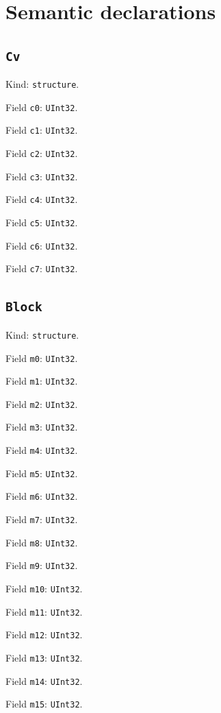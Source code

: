 \documentclass[11pt]{article}
\begin{document}
\section*{Semantic declarations}
\subsection*{\texttt{Cv}}
\noindent Kind: \texttt{structure}.\par
\noindent Field \texttt{c0}: \texttt{UInt32}.\par
\noindent Field \texttt{c1}: \texttt{UInt32}.\par
\noindent Field \texttt{c2}: \texttt{UInt32}.\par
\noindent Field \texttt{c3}: \texttt{UInt32}.\par
\noindent Field \texttt{c4}: \texttt{UInt32}.\par
\noindent Field \texttt{c5}: \texttt{UInt32}.\par
\noindent Field \texttt{c6}: \texttt{UInt32}.\par
\noindent Field \texttt{c7}: \texttt{UInt32}.\par
\subsection*{\texttt{Block}}
\noindent Kind: \texttt{structure}.\par
\noindent Field \texttt{m0}: \texttt{UInt32}.\par
\noindent Field \texttt{m1}: \texttt{UInt32}.\par
\noindent Field \texttt{m2}: \texttt{UInt32}.\par
\noindent Field \texttt{m3}: \texttt{UInt32}.\par
\noindent Field \texttt{m4}: \texttt{UInt32}.\par
\noindent Field \texttt{m5}: \texttt{UInt32}.\par
\noindent Field \texttt{m6}: \texttt{UInt32}.\par
\noindent Field \texttt{m7}: \texttt{UInt32}.\par
\noindent Field \texttt{m8}: \texttt{UInt32}.\par
\noindent Field \texttt{m9}: \texttt{UInt32}.\par
\noindent Field \texttt{m10}: \texttt{UInt32}.\par
\noindent Field \texttt{m11}: \texttt{UInt32}.\par
\noindent Field \texttt{m12}: \texttt{UInt32}.\par
\noindent Field \texttt{m13}: \texttt{UInt32}.\par
\noindent Field \texttt{m14}: \texttt{UInt32}.\par
\noindent Field \texttt{m15}: \texttt{UInt32}.\par
\end{document}
